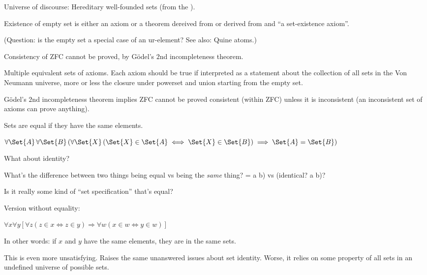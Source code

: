 Universe of discourse: 
Hereditary well-founded sets 
(from the ).

Existence of empty set is either an 
axiom\cite{wiki:Axiom_of_empty_set}
or a theorem dereived from 
or derived from 
and ``a set-existence axiom''.

(Question: is the empty set a special case of an ur-element?
See also: Quine atoms\cite{wiki:Urelement}.)

Consistency of \textsf{ZFC} cannot be proved, 
by G\"{o}del's $2$nd incompleteness theorem.

Multiple equivalent sets of axioms.
Each axiom should be true if interpreted as a statement about the
collection of all sets in the Von Neumann 
universe\cite{wiki:Von_Neumann_universe},
more or less the closure under powerset and union starting
from the empty set.

G\"{o}del's $2$nd incompleteness theorem implies \textsf{ZFC}
cannot be proved consistent (within \textsf{ZFC}) 
unless it is inconsistent 
(an inconsistent set of axioms can prove anything).


Sets are equal if they have the same 
elements.\cite{wiki:Axiom_of_extensionality,wiki:Extensionality}

$\forall \Set{A}\,\forall \Set{B}\,
(\forall \Set{X}\,(\Set{X}\in \Set{A}\iff \Set{X}\in \Set{B})
\implies \Set{A}=\Set{B})$

What about identity? 

What's the difference between two things being equal vs
being the \textit{same} thing? 
\textsf{= a b)} vs \textsf{(identical? a b)}?

Is it really some kind of ``set specification'' that's equal?

Version without equality:

$\forall x
\forall y
[\forall z(z\in x\Leftrightarrow z\in y)
\Rightarrow 
\forall w(x\in w\Leftrightarrow y\in w)]$

In other words: if $x$ and $y$ have the same elements, 
they are in the same sets.

This is even more unsatisfying. 
Raises the same unanswered issues about set identity.
Worse, it relies on some property of all sets in an undefined 
universe of possible sets.

